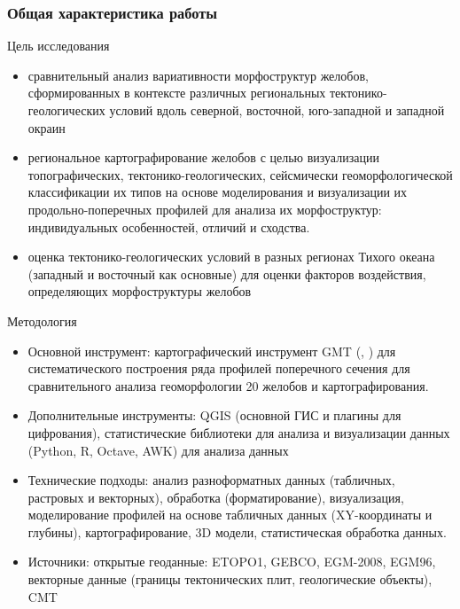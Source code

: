 \documentclass[pdflatex,compress,8pt,
	xcolor={dvipsnames,dvipsnames,svgnames,x11names,table},
	hyperref={colorlinks = true,breaklinks = true, urlcolor = NavyBlue}]{beamer}
\begin{document}
\begin{frame}\frametitle{Общая характеристика работы}
	\begin{exampleblock}{Цель исследования}
\begin{itemize}\small
	\item сравнительный анализ вариативности морфоструктур желобов, сформированных в контексте различных региональных тектонико-геологических условий вдоль северной, восточной, юго-западной и западной окраин
	\item региональное картографирование желобов с целью визуализации топографических, тектонико-геологических, сейсмически геоморфологической классификации их типов на основе моделирования и визуализации их продольно-поперечных профилей для анализа их морфоструктур: индивидуальных особенностей, отличий и
сходства.
	\item оценка тектонико-геологических условий в разных регионах Тихого океана (западный и восточный как основные) для оценки факторов воздействия, определяющих морфоструктуры желобов
\end{itemize}
	\end{exampleblock}
	\begin{alertblock}{Методология}
\begin{itemize}\small
	\item Основной инструмент: картографический инструмент GMT (\cite{Wessel1998}, \cite{WesselSmith1996}) для систематического построения ряда профилей поперечного сечения для сравнительного анализа геоморфологии 20 желобов и картографирования.
	\item Дополнительные инструменты: QGIS (основной ГИС и плагины для цифрования), статистические библиотеки для анализа и визуализации данных (Python, R, Octave, AWK) для анализа данных
	\item Технические подходы: анализ разноформатных данных (табличных, растровых и векторных), обработка (форматирование), визуализация, моделирование профилей на основе табличных данных (XY-координаты и глубины), картографирование, 3D модели, статистическая обработка данных. 
	\item Источники: открытые геоданные: ETOPO1, GEBCO, EGM-2008, EGM96, векторные данные (границы тектонических плит, геологические объекты), CMT
\end{itemize}
 	\end{alertblock}
\end{frame}
\end{document}
